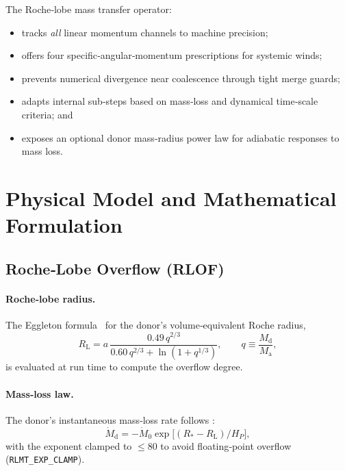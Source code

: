 \documentclass[11pt]{article}
\begin{document}
The Roche‑lobe mass transfer operator:

\begin{itemize}[nosep,leftmargin=1.8em]
\item tracks \emph{all} linear momentum channels to machine precision;
\item offers four specific‑angular‑momentum prescriptions for systemic winds;
\item prevents numerical divergence near coalescence through tight merge guards;
\item adapts internal sub‑steps based on mass‑loss and dynamical
      time‑scale criteria; and
\item exposes an optional donor mass‑radius power law for adiabatic
      responses to mass loss.
\end{itemize}

\section{Physical Model and Mathematical Formulation}

\subsection{Roche‑Lobe Overflow (RLOF)}
\label{sec:RLOF}

\paragraph{Roche‑lobe radius.}
The Eggleton formula~\cite{Eggleton1983} for the donor’s
volume‑equivalent Roche radius,
\begin{equation}
R_{\mathrm L}
 = a\,
   \frac{0.49\,q^{2/3}}{0.60\,q^{2/3}+\ln(1+q^{1/3})},
\qquad
q\equiv\frac{M_{\mathrm d}}{M_{\mathrm a}},
\label{eq:Eggleton}
\end{equation}
is evaluated at run time to compute the overflow degree.

\paragraph{Mass‑loss law.}
The donor’s instantaneous mass‑loss rate follows
\citet{Ritter1988}:
\begin{equation}
\dot M_{\mathrm d}
 = -\dot M_0
   \exp\!\bigl[(R_{*}-R_{\mathrm L})/H_P\bigr],
\label{eq:Ritter}
\end{equation}
with the exponent clamped to $\le80$ to avoid floating‑point overflow
(\texttt{RLMT\_EXP\_CLAMP}).
\end{document}
